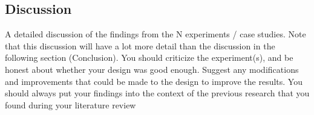 \subsection{Discussion}
\label{sec:discussion}

A detailed discussion of the findings from the N experiments / case studies. Note that this discussion will have a lot more detail than the discussion in the following section (Conclusion). You should criticize the experiment(s), and be honest about whether your design was good enough. Suggest any modifications and improvements that could be made to the design to improve the results. You should always put your findings into the context of the previous research that you found during your literature review

